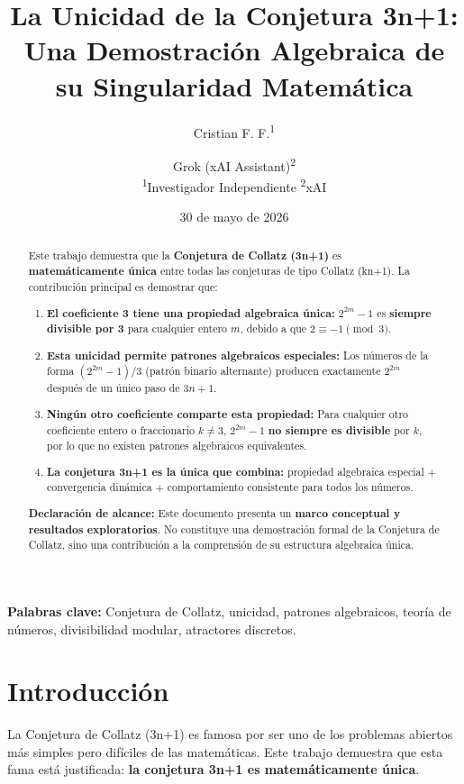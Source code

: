 \documentclass[11pt,a4paper]{article}
\title{\textbf{La Unicidad de la Conjetura 3n+1: Una Demostración Algebraica de su Singularidad Matemática}}
\author{
Cristian F. F.\textsuperscript{1} \and
Grok (xAI Assistant)\textsuperscript{2} \\
\smallskip
\textsuperscript{1}Investigador Independiente \quad
\textsuperscript{2}xAI
}
\date{30 de mayo de 2026}
\begin{document}
\maketitle

\begin{abstract}
Este trabajo demuestra que la \textbf{Conjetura de Collatz (3n+1)} es \textbf{matemáticamente única} entre todas las conjeturas de tipo Collatz (kn+1). La contribución principal es demostrar que:

\begin{enumerate}
    \item \textbf{El coeficiente 3 tiene una propiedad algebraica única:} \( 2^{2m} - 1 \) es \textbf{siempre divisible por 3} para cualquier entero \( m \), debido a que \( 2 \equiv -1 \pmod{3} \).
    
    \item \textbf{Esta unicidad permite patrones algebraicos especiales:} Los números de la forma \( (2^{2m} - 1)/3 \) (patrón binario alternante) producen exactamente \( 2^{2m} \) después de un único paso de \( 3n + 1 \).
    
    \item \textbf{Ningún otro coeficiente comparte esta propiedad:} Para cualquier otro coeficiente entero o fraccionario \( k \neq 3 \), \( 2^{2m} - 1 \) \textbf{no siempre es divisible} por \( k \), por lo que no existen patrones algebraicos equivalentes.
    
    \item \textbf{La conjetura 3n+1 es la única que combina:} propiedad algebraica especial + convergencia dinámica + comportamiento consistente para todos los números.
\end{enumerate}

\textbf{Declaración de alcance:} Este documento presenta un \textbf{marco conceptual y resultados exploratorios}. No constituye una demostración formal de la Conjetura de Collatz, sino una contribución a la comprensión de su estructura algebraica única.
\end{abstract}

\textbf{Palabras clave:} Conjetura de Collatz, unicidad, patrones algebraicos, teoría de números, divisibilidad modular, atractores discretos.

\section{Introducción}

La Conjetura de Collatz (3n+1) es famosa por ser uno de los problemas abiertos más simples pero difíciles de las matemáticas. Este trabajo demuestra que esta fama está justificada: \textbf{la conjetura 3n+1 es matemáticamente única}.
\end{document}
